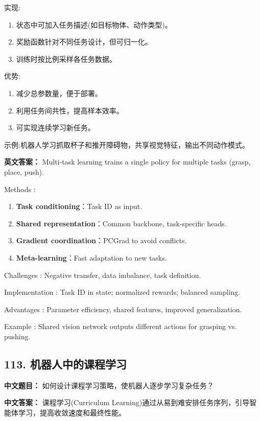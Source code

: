 \documentclass[10pt,a4paper]{ctexart}
\begin{document}
 实现:
\begin{enumerate}
    \item 状态中可加入任务描述(如目标物体、动作类型)。
    \item 奖励函数针对不同任务设计，但可归一化。
    \item 训练时按比例采样各任务数据。
\end{enumerate}

 优势:
\begin{enumerate}
    \item 减少总参数量，便于部署。
    \item 利用任务间共性，提高样本效率。
    \item 可实现连续学习新任务。
\end{enumerate}

 示例:机器人学习抓取杯子和推开障碍物，共享视觉特征，输出不同动作模式。

\textbf{英文答案：}  
Multi-task learning trains a single policy for multiple tasks (grasp, place, push).

 Methods :
\begin{enumerate}
    \item \textbf{Task conditioning}：Task ID as input.
    \item \textbf{Shared representation}：Common backbone, task-specific heads.
    \item \textbf{Gradient coordination}：PCGrad to avoid conflicts.
    \item \textbf{Meta-learning}：Fast adaptation to new tasks.
\end{enumerate}

 Challenges : Negative transfer, data imbalance, task definition.

 Implementation : Task ID in state; normalized rewards; balanced sampling.

 Advantages : Parameter efficiency, shared features, improved generalization.

 Example : Shared vision network outputs different actions for grasping vs. pushing.

\subsection*{113. 机器人中的课程学习}
\textbf{中文题目：} 如何设计课程学习策略，使机器人逐步学习复杂任务？

\textbf{中文答案：}  
课程学习(Curriculum Learning)通过从易到难安排任务序列，引导智能体学习，提高收敛速度和最终性能。
\end{document}
